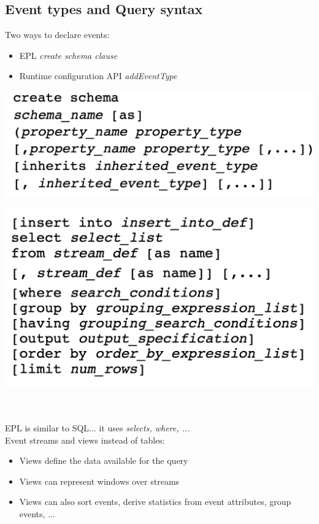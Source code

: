\documentclass[10pt,a4paper]{article}
\newcommand{\nline}{\\~\\}
\begin{document}
\subsection{Event types and Query syntax}
Two ways to declare events:
\begin{itemize}
	\item EPL \textit{create schema clause}
	\item Runtime configuration API \textit{addEventType}
\end{itemize}
\begin{minipage}{.5\textwidth}
  \centering
  \includegraphics[width=.8\linewidth]{images/epl-declare}
\end{minipage}%
\begin{minipage}{.5\textwidth}
  \centering
  \includegraphics[width=.8\linewidth]{images/epl-query}
\end{minipage}
\nline
EPL is similar to SQL... it uses \textit{selects, where, ...} \\
Event streams and views instead of tables:
\begin{itemize}
	\item Views define the data available for the query
	\item Views can represent windows over streams
	\item Views can also sort events, derive statistics from event attributes, group events, ...
\end{itemize}
\end{document}
